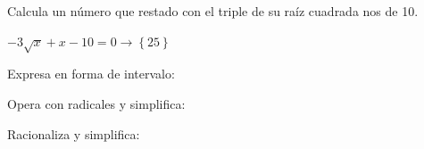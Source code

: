 \documentclass[addpoints,spanish, 12pt,a4paper]{exam}
\begin{document}
\begin{questions}




\question[2] Calcula un número que restado con el triple de su raíz cuadrada nos de 10.
\addpoints %


\begin{solution}
 	$- 3 \sqrt{x} + x - 10 = 0\to \left\{25\right\}$ 
\end{solution}




\question Expresa en forma de intervalo:

\begin{parts}
\part[1] $\left| {x +3 } \right|\geqslant 1$
\begin{solution}
$\left(-\infty, -4\right] \cup \left[-2, \infty\right) $
\end{solution}
\end{parts}

\addpoints


\question Opera con radicales y simplifica:

\addpoints

\question Racionaliza y simplifica:
\addpoints





\end{questions}
\end{document}
